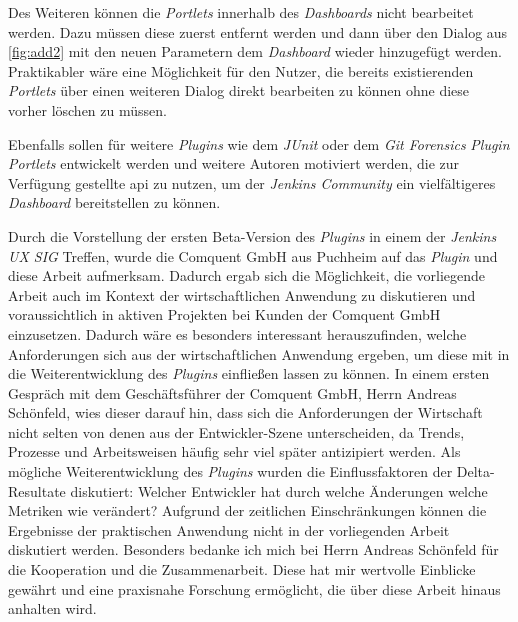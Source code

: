 Des Weiteren können die \textit{Portlets} innerhalb des \textit{Dashboards} nicht bearbeitet werden. Dazu müssen diese zuerst entfernt werden und dann über den Dialog aus \autoref{fig:add2} mit den neuen Parametern dem \textit{Dashboard} wieder hinzugefügt werden. Praktikabler wäre eine Möglichkeit für den Nutzer, die bereits existierenden \textit{Portlets} über einen weiteren Dialog direkt bearbeiten zu können ohne diese vorher löschen zu müssen. 

Ebenfalls sollen für weitere \textit{Plugins} wie dem \textit{JUnit} \citep{junit-plugin} oder dem \textit{Git Forensics} \textit{Plugin} \citep{git-forensics-plugin} \textit{Portlets} entwickelt werden und weitere Autoren motiviert werden, die zur Verfügung gestellte \ac{api}  zu nutzen, um der \textit{Jenkins Community} ein vielfältigeres \textit{Dashboard} bereitstellen zu können. 

Durch die Vorstellung der ersten Beta-Version des \textit{Plugins} in einem der \textit{Jenkins UX SIG} Treffen, wurde die Comquent GmbH aus Puchheim auf das \textit{Plugin} und diese Arbeit aufmerksam.  Dadurch ergab sich die Möglichkeit, die vorliegende Arbeit auch im Kontext der wirtschaftlichen Anwendung zu diskutieren und voraussichtlich in aktiven Projekten bei Kunden der Comquent GmbH einzusetzen. Dadurch wäre es besonders interessant herauszufinden, welche Anforderungen sich aus der wirtschaftlichen Anwendung ergeben, um diese mit in die Weiterentwicklung des \textit{Plugins} einfließen lassen zu können. In einem ersten Gespräch mit dem Geschäftsführer der Comquent GmbH, Herrn Andreas Schönfeld, wies dieser darauf hin, dass sich die Anforderungen der Wirtschaft nicht selten von denen aus der Entwickler-Szene unterscheiden, da Trends, Prozesse und Arbeitsweisen häufig sehr viel später antizipiert werden. 
Als mögliche Weiterentwicklung des \textit{Plugins} wurden die Einflussfaktoren der Delta-Resultate diskutiert: Welcher Entwickler hat durch welche Änderungen welche Metriken wie verändert? 
Aufgrund der zeitlichen Einschränkungen können die Ergebnisse der praktischen Anwendung nicht in der vorliegenden Arbeit diskutiert werden. 
Besonders bedanke ich mich bei Herrn Andreas Schönfeld für die Kooperation und die Zusammenarbeit. Diese hat mir wertvolle Einblicke gewährt und eine praxisnahe Forschung ermöglicht, die über diese Arbeit hinaus anhalten wird.